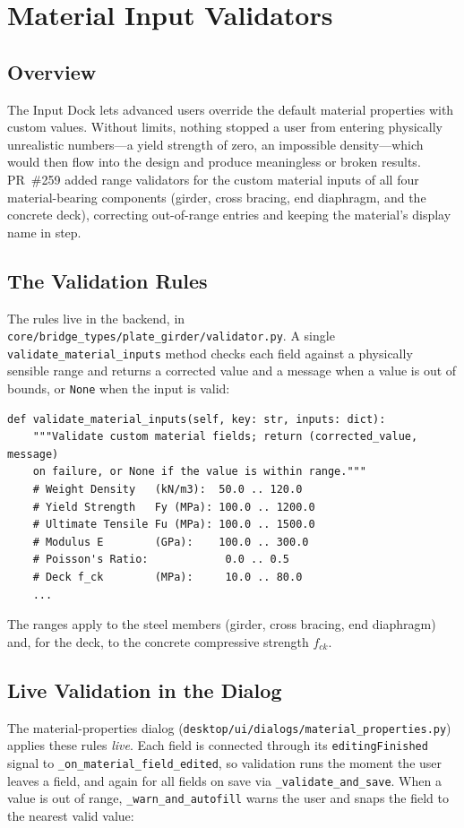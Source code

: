 \chapter{Material Input Validators}
\label{ch:validators}

\section{Overview}
The Input Dock lets advanced users override the default material properties with custom values.
Without limits, nothing stopped a user from entering physically unrealistic numbers---a yield
strength of zero, an impossible density---which would then flow into the design and produce
meaningless or broken results. PR~\#259 added range validators for the custom material inputs of
all four material-bearing components (girder, cross bracing, end diaphragm, and the concrete
deck), correcting out-of-range entries and keeping the material's display name in step.

\section{The Validation Rules}
The rules live in the backend, in
\texttt{core/bridge\_types/plate\_girder/validator.py}. A single
\texttt{validate\_material\_inputs} method checks each field against a physically sensible range
and returns a corrected value and a message when a value is out of bounds, or \texttt{None} when
the input is valid:

\begin{lstlisting}[caption={Range validation for custom material properties (\texttt{validator.py}).},label={lst:matvalidator}]
def validate_material_inputs(self, key: str, inputs: dict):
    """Validate custom material fields; return (corrected_value, message)
    on failure, or None if the value is within range."""
    # Weight Density   (kN/m3):  50.0 .. 120.0
    # Yield Strength   Fy (MPa): 100.0 .. 1200.0
    # Ultimate Tensile Fu (MPa): 100.0 .. 1500.0
    # Modulus E        (GPa):    100.0 .. 300.0
    # Poisson's Ratio:            0.0 .. 0.5
    # Deck f_ck        (MPa):     10.0 .. 80.0
    ...
\end{lstlisting}

The ranges apply to the steel members (girder, cross bracing, end diaphragm) and, for the deck,
to the concrete compressive strength $f_{ck}$.

\section{Live Validation in the Dialog}
The material-properties dialog (\texttt{desktop/ui/dialogs/material\_properties.py}) applies these
rules \emph{live}. Each field is connected through its \texttt{editingFinished} signal to
\texttt{\_on\_material\_field\_edited}, so validation runs the moment the user leaves a field,
and again for all fields on save via \texttt{\_validate\_and\_save}. When a value is out of
range, \texttt{\_warn\_and\_autofill} warns the user and snaps the field to the nearest valid
value:

